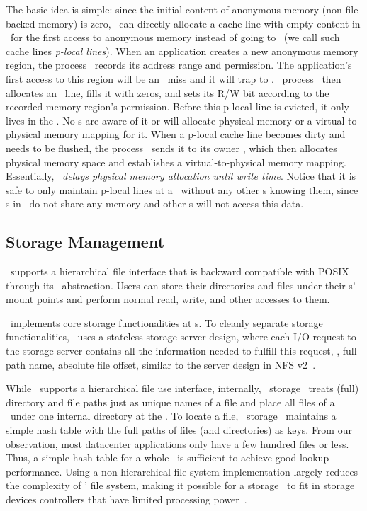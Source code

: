 The basic idea is simple: since the initial content of anonymous memory 
(non-file-backed memory) is zero, %
\lego\ can directly allocate a cache line with empty content
in \excache\ for the first access to 
anonymous memory instead of going to \mcomponent\
(we call such cache lines {\em p-local lines}).
When an application creates a new anonymous memory region, the process \microos\ records its address range and permission.
The application's first access to this region will be an \excache\ miss and it will trap to \lego.
\lego\ process \microos\ then allocates an \excache\ line, fills it with zeros, 
and sets its R/W bit according to the recorded memory region's permission.
Before this p-local line is evicted, it only lives in the \excache.
No \mcomponent{}s are aware of it or will allocate physical memory or a virtual-to-physical memory mapping for it.
When a p-local cache line becomes dirty and needs to be flushed, 
the process \microos\ sends it to its owner \mcomponent, which then
allocates physical memory space and establishes a virtual-to-physical memory mapping.
Essentially, \lego\ {\em delays physical memory allocation until write time}.
Notice that it is safe to only maintain p-local lines at a \pcomponent{} \excache\ 
without any other \pcomponent{}s knowing them, 
since \pcomponent{}s in \lego\ do not share any memory
and other \pcomponent{}s will not access this data.

\subsection{Storage Management}
\lego\ supports a hierarchical file interface that is backward compatible with POSIX 
through its \vnode\ abstraction. 
Users can store their directories and files under their \vnode{}s' mount points
and perform normal read, write, and other accesses to them.

\lego\ implements core storage functionalities at \scomponent{}s.
To cleanly separate storage functionalities, \lego\ uses a stateless storage server design, 
where each I/O request to the storage server contains all the information needed to 
fulfill this request, \eg, full path name, absolute file offset,
similar to the server design in NFS v2~\cite{Sandberg-NFS-85}.

While \lego\ supports a hierarchical file use interface,
internally, \lego\ storage \microos\ treats (full) directory and file paths just as unique names of a file
and place all files of a \vnode\ under one internal directory at the \scomponent{}.
To locate a file, \lego\ storage \microos\ maintains a simple hash table with the full paths of files (and directories) as keys.
From our observation, most datacenter applications only have a few hundred files or less.
Thus, a simple hash table for a whole \vnode\ is sufficient to achieve good lookup performance.
Using a non-hierarchical file system implementation largely reduces the complexity of \lego' file system,
making it possible for a storage \microos\ to fit in storage devices controllers that have limited processing power~\cite{Willow}.

